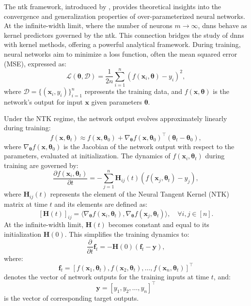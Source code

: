 

The \ac{ntk} framework, introduced by \citet{jacot2018neural}, provides theoretical insights into the convergence and generalization properties of over-parameterized neural networks. At the infinite-width limit, where the number of neurons \( m \to \infty \), \acp{dnn} behave as kernel predictors governed by the \ac{ntk}. This connection bridges the study of \acp{dnn} with kernel methods, offering a powerful analytical framework. During training, neural networks aim to minimize a loss function, often the mean squared error (MSE), expressed as:
\[
\mathcal{L}(\boldsymbol{\theta}, \mathcal{D}) = \frac{1}{2n} \sum_{i=1}^n (f(\mathbf{x}_i, \boldsymbol{\theta}) - y_i)^2,
\]
where \( \mathcal{D} = \{(\mathbf{x}_i, y_i)\}_{i=1}^n \) represents the training data, and \( f(\mathbf{x}, \boldsymbol{\theta}) \) is the network's output for input \( \mathbf{x} \) given parameters \( \boldsymbol{\theta} \).

Under the NTK regime, the network output evolves approximately linearly during training:
\[
f(\mathbf{x}, \boldsymbol{\theta}_t) \approx f(\mathbf{x}, \boldsymbol{\theta}_0) + \nabla_{\boldsymbol{\theta}} f(\mathbf{x}, \boldsymbol{\theta}_0)^\top (\boldsymbol{\theta}_t - \boldsymbol{\theta}_0),
\]
where \( \nabla_{\boldsymbol{\theta}} f(\mathbf{x}, \boldsymbol{\theta}_0) \) is the Jacobian of the network output with respect to the parameters, evaluated at initialization. The dynamics of \( f(\mathbf{x}_i, \boldsymbol{\theta}_t) \) during training are governed by:
\[
\frac{\partial f(\mathbf{x}_i, \boldsymbol{\theta}_t)}{\partial t} = -\sum_{j=1}^n \mathbf{H}_{ij}(t) \left( f(\mathbf{x}_j, \boldsymbol{\theta}_t) - y_j \right),
\]
where \( \mathbf{H}_{ij}(t) \) represents the element of the Neural Tangent Kernel (NTK) matrix at time \( t \) and its elements are defined as:
\[
[\mathbf{H}(t)]_{ij} = \langle \nabla_{\boldsymbol{\theta}} f(\mathbf{x}_i, \boldsymbol{\theta}_t), \nabla_{\boldsymbol{\theta}} f(\mathbf{x}_j, \boldsymbol{\theta}_t) \rangle, \quad \forall i, j \in [n].
\]
At the infinite-width limit, \( \mathbf{H}(t) \) becomes constant and equal to its initialization \( \mathbf{H}(0) \). This simplifies the training dynamics to:
\[
\frac{\partial}{\partial t} \mathbf{f}_t = -\mathbf{H}(0)(\mathbf{f}_t - \mathbf{y}),
\]
where:
\[
\mathbf{f}_t = [f(\mathbf{x}_1, \boldsymbol{\theta}_t), f(\mathbf{x}_2, \boldsymbol{\theta}_t), \ldots, f(\mathbf{x}_n, \boldsymbol{\theta}_t)]^\top
\]
denotes the vector of network outputs for the training inputs at time \( t \), and:
\[
\mathbf{y} = [y_1, y_2, \ldots, y_n]^\top
\]
is the vector of corresponding target outputs.

